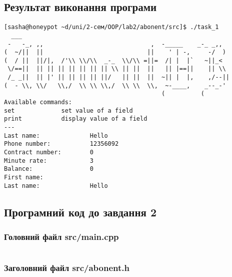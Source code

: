 \documentclass[a4paper, 12pt, oneside]{extarticle}
\begin{document}
\subsection*{Результат виконання програми}

\begin{verbatim}
[sasha@honeypot ~d/uni/2-сем/OOP/lab2/abonent/src]$ ./task_1
  ___
 -   -_, ,,                              ,  -_____    _-_ _,,
(  ~/||  ||                             ||    ' | -,     -/  )
(  / ||  ||/|,  /'\\ \\/\\  _-_  \\/\\ =||=  /| |  |`   ~||_<
 \/==||  || || || || || || || \\ || ||  ||   || |==||    || \\
 /_ _||  || |' || || || || ||/   || ||  ||  ~|| |  |,    ,/--||
(  - \\, \\/   \\,/  \\ \\ \\,/  \\ \\  \\,  ~-____,    _--_-'
                                            (          (
Available commands:
set             set value of a field
print           display value of a field
---
Last name:              Hello
Phone number:           12356092
Contract number:        0
Minute rate:            3
Balance:                0
First name:
Last name:              Hello
\end{verbatim}

\subsection*{Програмний код до завдання 2}

\subsubsection*{Головний файл src/main.cpp}
\inputminted{c++}{abonents/src/main.cpp}

\subsubsection*{Заголовний файл src/abonent.h}
\inputminted{c++}{abonents/include/abonent.h}
\end{document}
